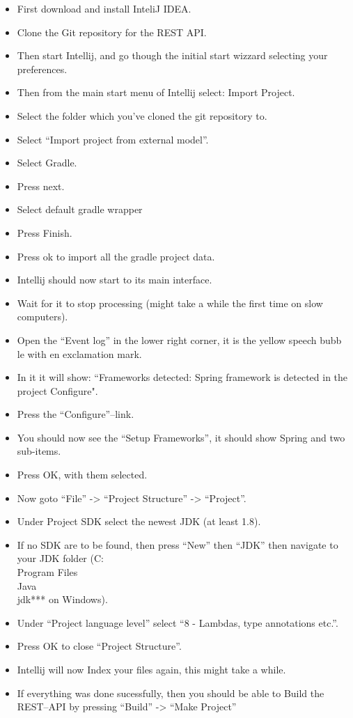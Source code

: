 \begin{itemize}
    \item First download and install InteliJ IDEA.
    \item Clone the Git repository for the REST API.
    \item Then start Intellij, and go though the initial start wizzard selecting your preferences.
    \item Then from the main start menu of Intellij select: Import Project.
    \item Select the folder which you've cloned the git repository to.
    \item Select ``Import project from external model''.
    \item Select Gradle.
    \item Press next.
    \item Select default gradle wrapper
    \item Press Finish.
    \item Press ok to import all the gradle project data.
    \item Intellij should now start to its main interface.
    \item Wait for it to stop processing (might take a while the first time on slow computers).
    \item Open the ``Event log'' in the lower right corner, it is the yellow speech bubb
le with en exclamation mark.
    \item In it it will show: ``Frameworks detected: Spring framework is detected in the project Configure".
    \item Press the ``Configure''--link.
    \item You should now see the ``Setup Frameworks'', it should show Spring and two sub-items.
    \item Press OK, with them selected.
    \item Now goto ``File'' -> ``Project Structure'' -> ``Project''.
    \item Under Project SDK select the newest JDK (at least 1.8).
    \item If no SDK are to be found, then press ``New'' then ``JDK'' then navigate to your JDK folder (C:\\Program Files\\Java\\jdk*** on Windows).
    \item Under ``Project language level'' select ``8 - Lambdas, type annotations etc.''.
    \item Press OK to close ``Project Structure''.
    \item Intellij will now Index your files again, this might take a while.
    \item If everything was done sucessfully, then you should be able to Build the REST--API by pressing ``Build'' -> ``Make Project''
\end{itemize}

